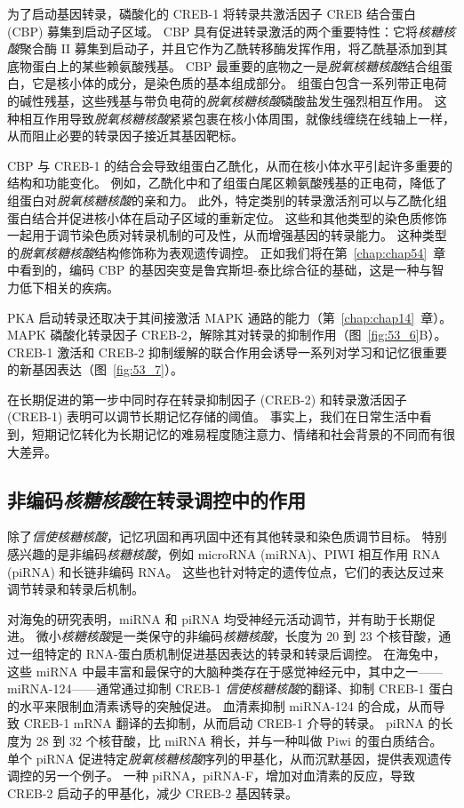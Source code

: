 为了启动基因转录，磷酸化的 CREB-1 将转录共激活因子 CREB 结合蛋白 (CBP) 募集到启动子区域。
CBP 具有促进转录激活的两个重要特性：它将\textit{核糖核酸}聚合酶 II 募集到启动子，并且它作为乙酰转移酶发挥作用，将乙酰基添加到其底物蛋白上的某些赖氨酸残基。
CBP 最重要的底物之一是\textit{脱氧核糖核酸}结合组蛋白，它是核小体的成分，是染色质的基本组成部分。
组蛋白包含一系列带正电荷的碱性残基，这些残基与带负电荷的\textit{脱氧核糖核酸}磷酸盐发生强烈相互作用。
这种相互作用导致\textit{脱氧核糖核酸}紧紧包裹在核小体周围，就像线缠绕在线轴上一样，从而阻止必要的转录因子接近其基因靶标。


CBP 与 CREB-1 的结合会导致组蛋白乙酰化，从而在核小体水平引起许多重要的结构和功能变化。
例如，乙酰化中和了组蛋白尾区赖氨酸残基的正电荷，降低了组蛋白对\textit{脱氧核糖核酸}的亲和力。
此外，特定类别的转录激活剂可以与乙酰化组蛋白结合并促进核小体在启动子区域的重新定位。 这些和其他类型的染色质修饰一起用于调节染色质对转录机制的可及性，从而增强基因的转录能力。
这种类型的\textit{脱氧核糖核酸}结构修饰称为表观遗传调控。
正如我们将在第~\ref{chap:chap54}~章中看到的，编码 CBP 的基因突变是鲁宾斯坦-泰比综合征的基础，这是一种与智力低下相关的疾病。


PKA 启动转录还取决于其间接激活 MAPK 通路的能力（第~\ref{chap:chap14}~章）。
MAPK 磷酸化转录因子 CREB-2，解除其对转录的抑制作用（图~\ref{fig:53_6}B）。
CREB-1 激活和 CREB-2 抑制缓解的联合作用会诱导一系列对学习和记忆很重要的新基因表达（图~\ref{fig:53_7}）。


在长期促进的第一步中同时存在转录抑制因子 (CREB-2) 和转录激活因子 (CREB-1) 表明可以调节长期记忆存储的阈值。
事实上，我们在日常生活中看到，短期记忆转化为长期记忆的难易程度随注意力、情绪和社会背景的不同而有很大差异。



\subsection{非编码\textit{核糖核酸}在转录调控中的作用}

除了\textit{信使核糖核酸}，记忆巩固和再巩固中还有其他转录和染色质调节目标。
特别感兴趣的是非编码\textit{核糖核酸}，例如 microRNA (miRNA)、PIWI 相互作用 RNA (piRNA) 和长链非编码 RNA。
这些也针对特定的遗传位点，它们的表达反过来调节转录和转录后机制。


对海兔的研究表明，miRNA 和 piRNA 均受神经元活动调节，并有助于长期促进。
微小\textit{核糖核酸}是一类保守的非编码\textit{核糖核酸}，长度为 20 到 23 个核苷酸，通过一组特定的 RNA-蛋白质机制促进基因表达的转录和转录后调控。
在海兔中，这些 miRNA 中最丰富和最保守的大脑种类存在于感觉神经元中，其中之一——miRNA-124——通常通过抑制 CREB-1 \textit{信使核糖核酸}的翻译、抑制 CREB-1 蛋白的水平来限制血清素诱导的突触促进。
血清素抑制 miRNA-124 的合成，从而导致 CREB-1 mRNA 翻译的去抑制，从而启动 CREB-1 介导的转录。
piRNA 的长度为 28 到 32 个核苷酸，比 miRNA 稍长，并与一种叫做 Piwi 的蛋白质结合。
单个 piRNA 促进特定\textit{脱氧核糖核酸}序列的甲基化，从而沉默基因，提供表观遗传调控的另一个例子。
一种 piRNA，piRNA-F，增加对血清素的反应，导致 CREB-2 启动子的甲基化，减少 CREB-2 基因转录。


